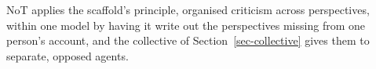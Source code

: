 NoT applies the scaffold's principle, organised criticism across
perspectives, within one model by having it write out the perspectives
missing from one person's account, and the collective of
Section~\ref{sec-collective} gives them to separate, opposed agents.
